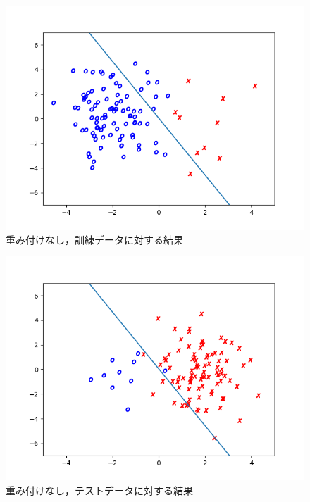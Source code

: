 \documentclass[class=jsarticle, crop=false, dvipdfmx, fleqn]{standalone}
\begin{document}
\begin{figure}[H]
    \centering
    \includegraphics[clip, width=12cm]{../figures/assignment3_result_unweighted_train}
    \caption{重み付けなし，訓練データに対する結果}
    \label{fig:unweighted_train}
\end{figure}

\begin{figure}[H]
    \centering
    \includegraphics[clip, width=12cm]{../figures/assignment3_result_unweighted_test}
    \caption{重み付けなし，テストデータに対する結果}
    \label{fig:unweighted_test}
\end{figure}
\end{document}
